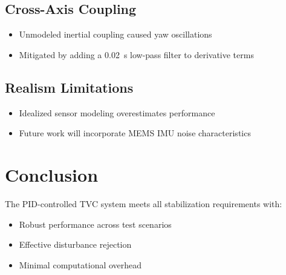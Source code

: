 \documentclass[a4paper,12pt]{article}
\begin{document}
\subsection{Cross-Axis Coupling}
\begin{itemize}
\item Unmodeled inertial coupling caused yaw oscillations
\item Mitigated by adding a \SI{0.02}{\second} low-pass filter to derivative terms
\end{itemize}

\subsection{Realism Limitations}
\begin{itemize}
\item Idealized sensor modeling overestimates performance
\item Future work will incorporate MEMS IMU noise characteristics
\end{itemize}

\section*{Conclusion}
The PID-controlled TVC system meets all stabilization requirements with:
\begin{itemize}
\item Robust performance across test scenarios
\item Effective disturbance rejection
\item Minimal computational overhead
\end{itemize}
\end{document}
